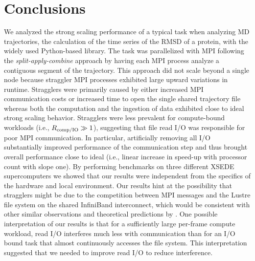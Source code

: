 
\section{Conclusions}
\label{sec:conclusions}

We analyzed the strong scaling performance of a typical task when analyzing MD trajectories, the calculation of the time series of the RMSD of a protein, with the widely used Python-based  library.
The task was parallelized with MPI following the \emph{split-apply-combine} approach by having each MPI process analyze a contiguous segment of the trajectory.
This approach did not scale beyond a single node because straggler MPI processes exhibited large upward variations in runtime.
Stragglers were primarily caused by either increased MPI communication costs or increased time to open the single shared trajectory file whereas both the computation and the ingestion of data exhibited close to ideal strong scaling behavior.
Stragglers were less prevalent for compute-bound workloads (i.e., $R_{\text{comp/IO}} \gg 1$), suggesting that file read I/O was responsible for poor MPI communication.
In particular, artificially removing all I/O substantially improved performance of the communication step and thus brought overall performance close to ideal (i.e., linear increase in speed-up with processor count with slope one).
By performing benchmarks on three different XSEDE supercomputers we showed that our results were independent from the specifics of the hardware and local environment.
Our results hint at the possibility that stragglers might be due to the competition between MPI messages and the Lustre file system on the shared InfiniBand interconnect, which would be consistent with other similar observations \cite{VMD2013} and theoretical predictions by \citet{Brown:2018ab}.
One possible interpretation of our results is that for a sufficiently large per-frame compute workload, read I/O interferes much less with communication than for an I/O bound task that almost continuously accesses the file system.
This interpretation suggested that we needed to improve read I/O to reduce interference.

